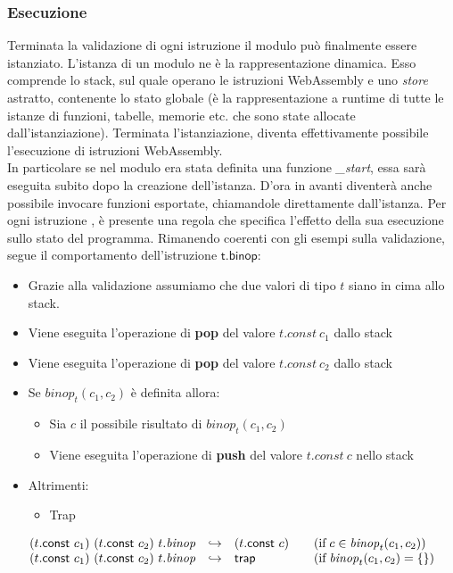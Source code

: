 \subsubsection{Esecuzione}
Terminata la validazione di ogni istruzione il modulo può finalmente essere istanziato.
L'istanza di un modulo ne è la rappresentazione dinamica. Esso comprende lo stack, sul quale operano le istruzioni WebAssembly e uno \emph{store} astratto, contenente lo stato globale (è la rappresentazione a runtime di tutte le istanze di funzioni, tabelle, memorie etc. che sono state allocate dall'istanziazione).
Terminata l'istanziazione, diventa effettivamente possibile l'esecuzione di istruzioni WebAssembly.
\\In particolare se nel modulo era stata definita una funzione \emph{\_start}, essa sarà eseguita subito dopo la creazione dell'istanza. D'ora in avanti diventerà anche possibile invocare funzioni esportate, chiamandole direttamente dall'istanza.
Per ogni istruzione , è presente una regola che specifica l'effetto della sua esecuzione sullo stato del programma. Rimanendo coerenti con gli esempi sulla validazione, segue il comportamento dell'istruzione \({\mathsf{t.binop}}\):
\begin{itemize}
        \item Grazie alla validazione assumiamo che due valori di tipo \(t\) siano in cima allo stack.
        \item Viene eseguita l'operazione di \textbf{pop} del valore \(t.const~c_1\) dallo stack
        \item Viene eseguita l'operazione di \textbf{pop} del valore \(t.const~c_2\) dallo stack
        \item Se \({\mathit{binop}}_t(c_1, c_2)\) è definita allora:
        \begin{itemize}
                \item Sia \(c\) il possibile risultato di \({\mathit{binop}}_t(c_1, c_2)\)
                \item Viene eseguita l'operazione di \textbf{push} del valore \(t.const~c\) nello stack
        \end{itemize}
        \item Altrimenti:
        \begin{itemize}
                \item Trap
        \end{itemize}
\end{itemize}
\begin{equation*}
        \begin{split}\begin{array}{lcl@{\qquad}l}
                (t\mathsf{.}{\mathsf{const}}~c_1)~(t\mathsf{.}{\mathsf{const}}~c_2)~t\mathsf{.}{\mathit{binop}} &{\hookrightarrow}& (t\mathsf{.}{\mathsf{const}}~c)
                  & (\mathrel{\mbox{if}} c \in {\mathit{binop}}_t(c_1,c_2)) \\
                (t\mathsf{.}{\mathsf{const}}~c_1)~(t\mathsf{.}{\mathsf{const}}~c_2)~t\mathsf{.}{\mathit{binop}} &{\hookrightarrow}& {\mathsf{trap}}
                  & (\mathrel{\mbox{if}} {\mathit{binop}}_{t}(c_1,c_2) = \{\})
                \end{array}\end{split}
\end{equation*}
